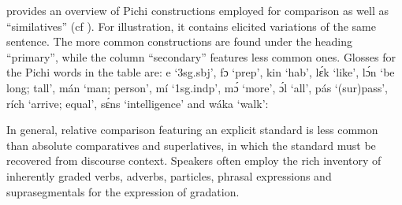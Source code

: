  provides an overview of Pichi constructions employed for comparison as well as “similatives” (cf ). For illustration, it contains elicited variations of the same sentence. The more common constructions are found under the heading “primary”, while the column “secondary” features less common ones. Glosses for the Pichi words in the table are: e ‘3sg.sbj’, fɔ ‘prep’, kin ‘hab’, lɛ́k ‘like’, lɔ́n ‘be long; tall’, mán ‘man; person’, mí ‘1sg.indp’, mɔ́ ‘more’, ɔ́l ‘all’, pás ‘(sur)pass’, rích ‘arrive; equal’, sɛ́ns ‘intelligence’ and wáka ‘walk’:

\begin{table}
\caption{Comparison}
\small
\label{tab:key:6.9}
\end{table}
In general, relative comparison featuring an explicit standard is less common than absolute comparatives and superlatives, in which the standard must be recovered from discourse context. Speakers often employ the rich inventory of inherently graded verbs, adverbs, particles, phrasal expressions and suprasegmentals for the expression of gradation. 

